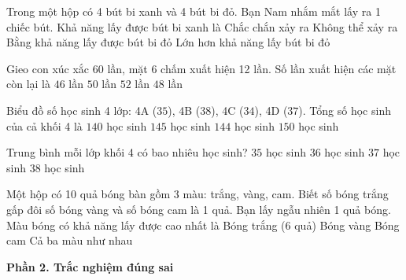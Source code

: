 \begin{ex} %
Trong một hộp có 4 bút bi xanh và 4 bút bi đỏ. Bạn Nam nhắm mắt lấy ra 1 chiếc bút. Khả năng lấy được bút bi xanh là
\choice
{Chắc chắn xảy ra}
{Không thể xảy ra}
{\True Bằng khả năng lấy được bút bi đỏ}
{Lớn hơn khả năng lấy bút bi đỏ}
\end{ex}

\begin{ex} %
Gieo con xúc xắc 60 lần, mặt 6 chấm xuất hiện 12 lần. Số lần xuất hiện các mặt còn lại là
\choice
{$46$ lần}
{$50$ lần}
{$52$ lần}
{\True $48$ lần}
\end{ex}

\begin{ex} %
Biểu đồ số học sinh 4 lớp: 4A ($35$), 4B ($38$), 4C ($34$), 4D ($37$). Tổng số học sinh của cả khối 4 là
\choice
{$140$ học sinh}
{$145$ học sinh}
{\True $144$ học sinh}
{$150$ học sinh}
\end{ex}

\begin{ex} %
Trung bình mỗi lớp khối 4 có bao nhiêu học sinh?
\choice
{$35$ học sinh}
{\True $36$ học sinh}
{$37$ học sinh}
{$38$ học sinh}
\end{ex}

\begin{ex} %
Một hộp có 10 quả bóng bàn gồm 3 màu: trắng, vàng, cam. Biết số bóng trắng gấp đôi số bóng vàng và số bóng cam là 1 quả. Bạn lấy ngẫu nhiên 1 quả bóng. Màu bóng có khả năng lấy được cao nhất là
\choice
{\True Bóng trắng (6 quả)}
{Bóng vàng}
{Bóng cam}
{Cả ba màu như nhau}
\end{ex}

\textbf{Phần 2. Trắc nghiệm đúng sai}


